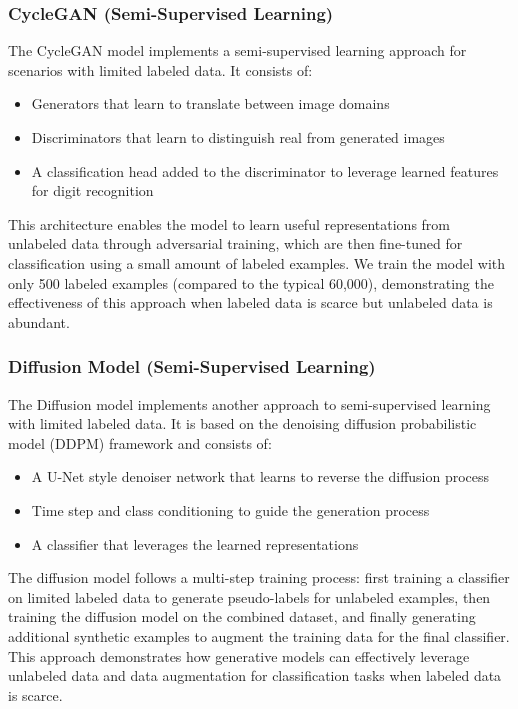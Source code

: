 \documentclass{article}
\begin{document}
\subsubsection{CycleGAN (Semi-Supervised Learning)}
The CycleGAN model implements a semi-supervised learning approach for scenarios with limited labeled data. It consists of:
\begin{itemize}
    \item Generators that learn to translate between image domains
    \item Discriminators that learn to distinguish real from generated images
    \item A classification head added to the discriminator to leverage learned features for digit recognition
\end{itemize}
This architecture enables the model to learn useful representations from unlabeled data through adversarial training, which are then fine-tuned for classification using a small amount of labeled examples. We train the model with only 500 labeled examples (compared to the typical 60,000), demonstrating the effectiveness of this approach when labeled data is scarce but unlabeled data is abundant.

\subsubsection{Diffusion Model (Semi-Supervised Learning)}
The Diffusion model implements another approach to semi-supervised learning with limited labeled data. It is based on the denoising diffusion probabilistic model (DDPM) framework and consists of:
\begin{itemize}
    \item A U-Net style denoiser network that learns to reverse the diffusion process
    \item Time step and class conditioning to guide the generation process
    \item A classifier that leverages the learned representations
\end{itemize}
The diffusion model follows a multi-step training process: first training a classifier on limited labeled data to generate pseudo-labels for unlabeled examples, then training the diffusion model on the combined dataset, and finally generating additional synthetic examples to augment the training data for the final classifier. This approach demonstrates how generative models can effectively leverage unlabeled data and data augmentation for classification tasks when labeled data is scarce.
\end{document}
